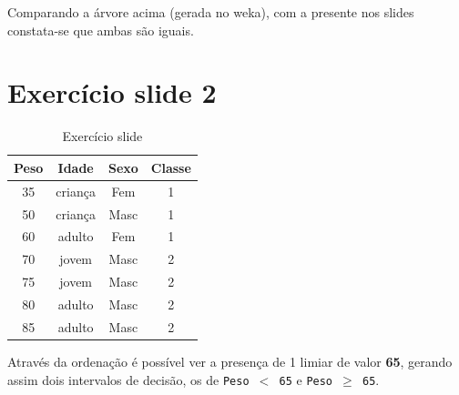 \documentclass[
    article,            %
    11pt,               %
    oneside,            %
    a4paper,            %
    english,            %
    brazil,             %
    sumario=tradicional,
    ]{abntex2}
\begin{document}
Comparando a árvore acima (gerada no weka), com a presente nos slides constata-se que ambas são iguais.

\section*{\textbf{Exercício slide 2}}

\begin{table}[H]
\centering
\caption{Exercício slide}
\begin{tabular}{|c|c|c|c|}
\hline
\rowcolor[HTML]{C0C0C0} 
Peso & Idade & Sexo & Classe  \\ \hline
35 & criança & Fem & 1  \\ \hline
50 & criança & Masc & 1  \\ \hline
60 & adulto & Fem & 1  \\ \hline
70 & jovem & Masc & 2  \\ \hline
75 & jovem & Masc & 2  \\ \hline
80 & adulto & Masc & 2  \\ \hline
85 & adulto & Masc & 2  \\ \hline
\end{tabular}
\end{table}

Através da ordenação é possível ver a presença de 1 limiar de valor \textbf{65}, gerando assim dois intervalos de decisão, os de \texttt{Peso $<$ 65} e \texttt{Peso $\ge$ 65}.
\end{document}
